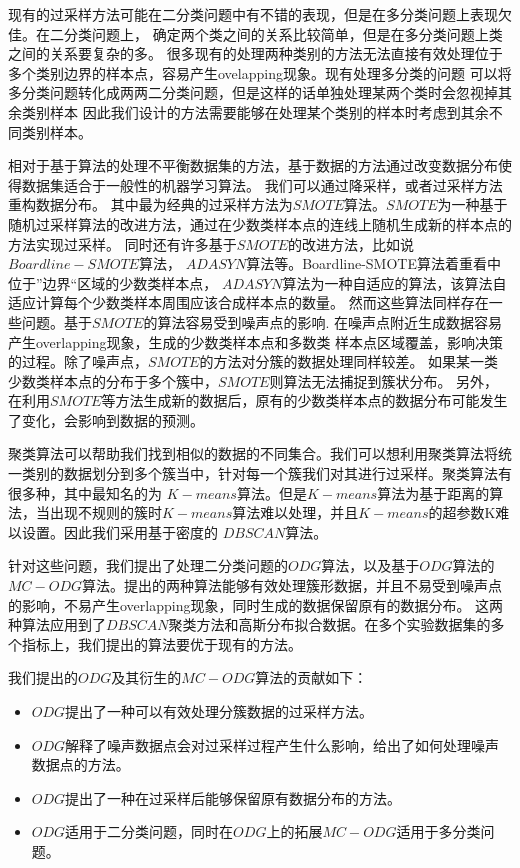 \documentclass{article}
\begin{document}
现有的过采样方法可能在二分类问题中有不错的表现，但是在多分类问题上表现欠佳\cite{2020Combined}。在二分类问题上，
确定两个类之间的关系比较简单，但是在多分类问题上类之间的关系要复杂的多\cite{2017Relevance}。
很多现有的处理两种类别的方法无法直接有效处理位于多个类别边界的样本点，容易产生ovelapping\cite{Jierui2013Overlapping}现象。现有处理多分类的问题
可以将多分类问题转化成两两二分类问题，但是这样的话单独处理某两个类时会忽视掉其余类别样本
因此我们设计的方法需要能够在处理某个类别的样本时考虑到其余不同类别样本。


相对于基于算法的处理不平衡数据集的方法，基于数据的方法通过改变数据分布使得数据集适合于一般性的机器学习算法。
我们可以通过降采样，或者过采样方法重构数据分布。
其中最为经典的过采样方法为$SMOTE$\cite{2002SMOTE}算法。$SMOTE$为一种基于随机过采样算法的改进方法，通过在少数类样本点的连线上随机生成新的样本点的方法实现过采样。
同时还有许多基于$SMOTE$的改进方法，比如说$Boardline-SMOTE$\cite{2005Borderline}算法，
$ADASYN$\cite{2008ADASYN}算法等。Boardline-SMOTE算法着重看中位于”边界“区域的少数类样本点，
$ADASYN$算法为一种自适应的算法，该算法自适应计算每个少数类样本周围应该合成样本点的数量。
然而这些算法同样存在一些问题。基于$SMOTE$的算法容易受到噪声点的影响\cite{2017CCR}.
在噪声点附近生成数据容易产生overlapping现象，生成的少数类样本点和多数类
样本点区域覆盖，影响决策的过程。除了噪声点，$SMOTE$的方法对分簇的数据处理同样较差。
如果某一类少数类样本点的分布于多个簇中，$SMOTE$则算法无法捕捉到簇状分布。
另外，在利用$SMOTE$等方法生成新的数据后，原有的少数类样本点的数据分布可能发生了变化，会影响到数据的预测。

聚类算法\cite{2011Data}可以帮助我们找到相似的数据的不同集合。我们可以想利用聚类算法将统一类别的数据划分到多个簇当中，针对每一个簇我们对其进行过采样。聚类算法有很多种，其中最知名的为
$K-means$算法。但是$K-means$算法为基于距离的算法，当出现不规则的簇时$K-means$算法难以处理，并且$K-means$的超参数K难以设置。因此我们采用基于密度的
$DBSCAN$算法。


针对这些问题，我们提出了处理二分类问题的$ODG$算法，以及基于$ODG$算法的$MC-ODG$算法。提出的两种算法能够有效处理簇形数据，并且不易受到噪声点的影响，不易产生overlapping现象，同时生成的数据保留原有的数据分布。
这两种算法应用到了$DBSCAN$聚类方法和高斯分布拟合数据。在多个实验数据集的多个指标上，我们提出的算法要优于现有的方法。

我们提出的$ODG$及其衍生的$MC-ODG$算法的贡献如下：
\begin{itemize}
  \item $ODG$提出了一种可以有效处理分簇数据的过采样方法。
  \item $ODG$解释了噪声数据点会对过采样过程产生什么影响，给出了如何处理噪声数据点的方法。
  \item $ODG$提出了一种在过采样后能够保留原有数据分布的方法。
  \item $ODG$适用于二分类问题，同时在$ODG$上的拓展$MC-ODG$适用于多分类问题。
\end{itemize}
\end{document}
